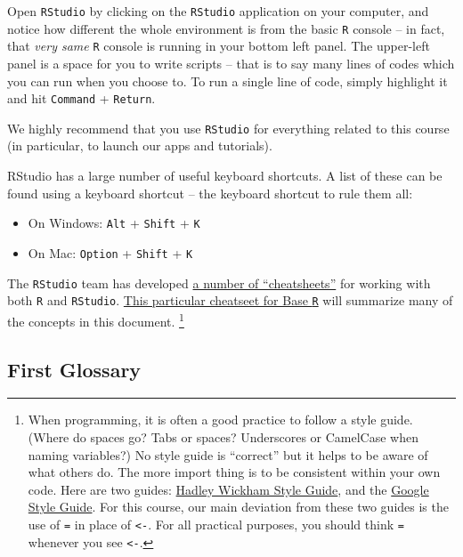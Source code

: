 \documentclass[]{book}
\providecommand{\tightlist}{%
  \setlength{\itemsep}{0pt}\setlength{\parskip}{0pt}}
\let\rmarkdownfootnote\footnote%
\def\footnote{\protect\rmarkdownfootnote}
\newenvironment{note}{\begin{tcolorbox}[colback=blue!5!white,colframe=blue!75!black,title=\textbf{Note:}]}{\end{tcolorbox}}
\theoremstyle{definition}
\theoremstyle{definition}
\theoremstyle{definition}
\theoremstyle{remark}
\begin{document}
Open \texttt{RStudio} by clicking on the \texttt{RStudio} application on
your computer, and notice how different the whole environment is from
the basic \texttt{R} console -- in fact, that \emph{very same}
\texttt{R} console is running in your bottom left panel. The upper-left
panel is a space for you to write scripts -- that is to say many lines
of codes which you can run when you choose to. To run a single line of
code, simply highlight it and hit \texttt{Command} + \texttt{Return}.

\begin{note}
We highly recommend that you use \texttt{RStudio} for everything related
to this course (in particular, to launch our apps and tutorials).
\end{note}

RStudio has a large number of useful keyboard shortcuts. A list of these
can be found using a keyboard shortcut -- the keyboard shortcut to rule
them all:

\begin{itemize}
\tightlist
\item
  On Windows: \texttt{Alt} + \texttt{Shift} + \texttt{K}
\item
  On Mac: \texttt{Option} + \texttt{Shift} + \texttt{K}
\end{itemize}

The \texttt{RStudio} team has developed
\href{https://www.rstudio.com/resources/cheatsheets/}{a number of
``cheatsheets''} for working with both \texttt{R} and \texttt{RStudio}.
\href{http://www.rstudio.com/wp-content/uploads/2016/05/base-r.pdf}{This
particular cheatseet for Base \texttt{R}} will summarize many of the
concepts in this document. \footnote{When programming, it is often a
  good practice to follow a style guide. (Where do spaces go? Tabs or
  spaces? Underscores or CamelCase when naming variables?) No style
  guide is ``correct'' but it helps to be aware of what others do. The
  more import thing is to be consistent within your own code. Here are
  two guides: \href{http://adv-r.had.co.nz/Style.html}{Hadley Wickham
  Style Guide}, and the
  \href{https://google.github.io/styleguide/Rguide.xml}{Google Style
  Guide}. For this course, our main deviation from these two guides is
  the use of \texttt{=} in place of \texttt{\textless{}-}. For all
  practical purposes, you should think \texttt{=} whenever you see
  \texttt{\textless{}-}.}

\subsection{First Glossary}\label{first-glossary}
\end{document}
